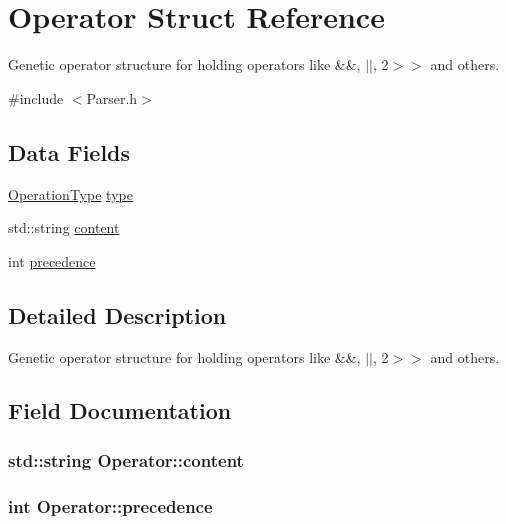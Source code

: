 \hypertarget{structOperator}{}\section{Operator Struct Reference}
\label{structOperator}


Genetic operator structure for holding operators like \&\&, $\vert$$\vert$, 2$>$$>$ and others.  




{\ttfamily \#include $<$Parser.\+h$>$}

\subsection*{Data Fields}
\begin{DoxyCompactItemize}
\item 
\hyperlink{Parser_8h_a9a2c9c31d675b34f6ec35cc1ca89e047}{Operation\+Type} \hyperlink{structOperator_a784d9909ad51fd9379c819ea78801c50}{type}
\item 
std\+::string \hyperlink{structOperator_ac4706331bbbbc58d5dd83659d2e1b5a5}{content}
\item 
int \hyperlink{structOperator_aa4ed8b193e03bd96ccb98bf96a84d7d8}{precedence}
\end{DoxyCompactItemize}


\subsection{Detailed Description}
Genetic operator structure for holding operators like \&\&, $\vert$$\vert$, 2$>$$>$ and others. 

\subsection{Field Documentation}
\subsubsection[{\texorpdfstring{content}{content}}]{\setlength{\rightskip}{0pt plus 5cm}std\+::string Operator\+::content}\hypertarget{structOperator_ac4706331bbbbc58d5dd83659d2e1b5a5}{}\label{structOperator_ac4706331bbbbc58d5dd83659d2e1b5a5}
\subsubsection[{\texorpdfstring{precedence}{precedence}}]{\setlength{\rightskip}{0pt plus 5cm}int Operator\+::precedence}\hypertarget{structOperator_aa4ed8b193e03bd96ccb98bf96a84d7d8}{}\label{structOperator_aa4ed8b193e03bd96ccb98bf96a84d7d8}
